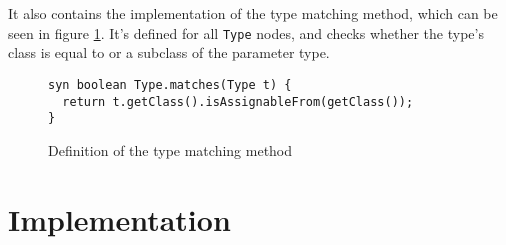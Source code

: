 \documentclass[nofilelist]{cslthse-msc}
\begin{document}
It also contains the implementation of the type matching method, which can be seen in figure \ref{typematches}.
It's defined for all \lstinline{Type} nodes, and checks whether the type's class is equal to or a subclass of the parameter type.

\begin{figure}[h]
  \begin{lstlisting}[language=jrag]
syn boolean Type.matches(Type t) {
  return t.getClass().isAssignableFrom(getClass());
}
  \end{lstlisting}
  \caption{Definition of the type matching method}
  \label{typematches}
\end{figure}








\section{Implementation}\label{typingrulecompiler} %
\end{document}
